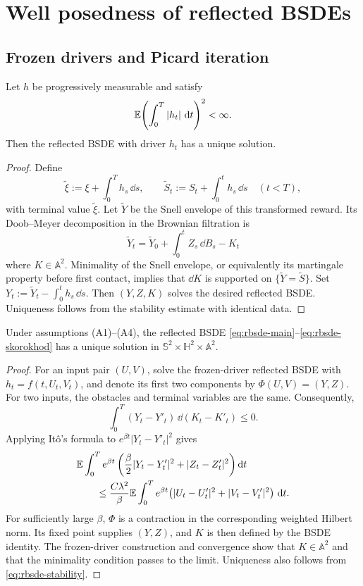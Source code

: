 \section{Well posedness of reflected BSDEs}

\subsection{Frozen drivers and Picard iteration}

\begin{proposition}
Let $h$ be progressively measurable and satisfy
\[
  \mathbb E\!\left(\int_0^T |h_t|\,\mathop{}\!\mathrm d t\right)^2<\infty.
\]
Then the reflected BSDE with driver $h_t$ has a unique solution.
\end{proposition}

\begin{proof}
Define
\[
  \widetilde\xi:=\xi+\int_0^T h_s\,\dd s,
  \qquad
  \widetilde S_t:=S_t+\int_0^t h_s\,\dd s
  \quad(t<T),
\]
with terminal value $\widetilde\xi$. Let $\widetilde Y$ be the Snell envelope
of this transformed reward. Its Doob--Meyer decomposition in the Brownian
filtration is
\[
  \widetilde Y_t=\widetilde Y_0+
  \int_0^t Z_s\,\dd B_s-K_t
\]
where $K\in\mathbb{A}^2$. Minimality of the Snell envelope, or equivalently its
martingale property before first contact, implies that $\dd K$ is supported
on $\{\widetilde Y=\widetilde S\}$. Set
$Y_t:=\widetilde Y_t-\int_0^t h_s\,\dd s$. Then $(Y,Z,K)$ solves the desired
reflected BSDE\@. Uniqueness follows from the stability estimate with identical
data.
\end{proof}

\begin{theorem}
Under assumptions (A1)--(A4), the reflected BSDE
\eqref{eq:rbsde-main}--\eqref{eq:rbsde-skorokhod} has a unique solution in
$\mathbb{S}^2\times\mathbb{H}^2\times\mathbb{A}^2$.
\end{theorem}

\begin{proof}
For an input pair $(U,V)$, solve the frozen-driver reflected BSDE with
$h_t=f(t,U_t,V_t)$, and denote its first two components by
$\Phi(U,V)=(Y,Z)$. For two inputs, the obstacles and terminal variables are
the same. Consequently,
\[
  \int_0^T (Y_t-Y'_t)\,\dd(K_t-K'_t)\leq0.
\]
Applying It\^o's formula to $e^{\beta t}|Y_t-Y'_t|^2$ gives
\begin{align*}
  &\mathbb E\int_0^T e^{\beta t}
     \left(\frac\beta2|Y_t-Y'_t|^2+|Z_t-Z'_t|^2\right)\mathop{}\!\mathrm d t\\
  &\qquad\leq
    \frac{C\lambda^2}{\beta}
    \mathbb E\int_0^T e^{\beta t}
      \bigl(|U_t-U'_t|^2+|V_t-V'_t|^2\bigr)\,\mathop{}\!\mathrm d t.
\end{align*}
For sufficiently large $\beta$, $\Phi$ is a contraction in the corresponding
weighted Hilbert norm. Its fixed point supplies $(Y,Z)$, and $K$ is then
defined by the BSDE identity. The frozen-driver construction and convergence
show that $K\in\mathbb{A}^2$ and that the minimality condition passes to the
limit. Uniqueness also follows from \eqref{eq:rbsde-stability}.
\end{proof}

